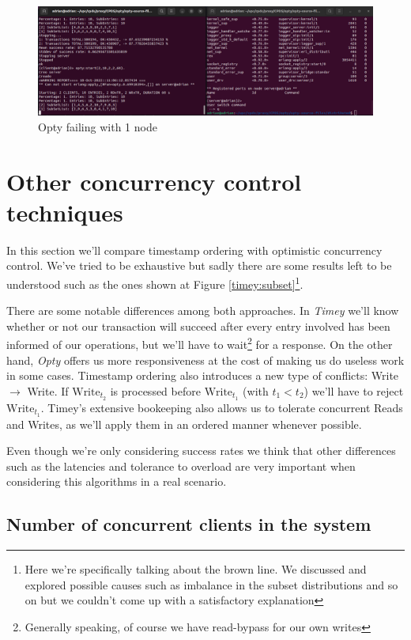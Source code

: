 \documentclass[a4paper, 10pt]{article}
\begin{document}
\begin{figure}[H]
  \centering
  \includegraphics[width=0.95\linewidth]{images/opty1node.png}
    \caption{Opty failing with 1 node}
    \label{fig:1node}
\end{figure} 

\clearpage
\section{Other concurrency control techniques}

In this section we'll compare timestamp ordering with optimistic concurrency control. We've tried to be exhaustive but sadly there are some results left to be understood such as the ones shown at Figure \ref{timey:subset}\footnote{Here we're specifically talking about the brown line. We discussed and explored possible causes such as imbalance in the subset distributions and so on but we couldn't come up with a satisfactory explanation}.

There are some notable differences among both approaches. In \textit{Timey} we'll know whether or not our transaction will succeed after every entry involved has been informed of our operations, but we'll have to wait\footnote{Generally speaking, of course we have read-bypass for our own writes} for a response. On the other hand, \textit{Opty} offers us more responsiveness at the cost of making us do useless work in some cases. Timestamp ordering also introduces a new type of conflicts: Write $\rightarrow$ Write. If $\text{Write}_{t_2}$ is processed before $\text{Write}_{t_1}$ (with $t_1 < t_2$) we'll have to reject $\text{Write}_{t_1}$. Timey's extensive bookeeping also allows us to tolerate concurrent Reads and Writes, as we'll apply them in an ordered manner whenever possible.

Even though we're only considering success rates we think that other differences such as the latencies and tolerance to overload are very important when considering this algorithms in a real scenario.

\subsection{Number of concurrent clients in the system}\label{timey-current-clients}
\end{document}
